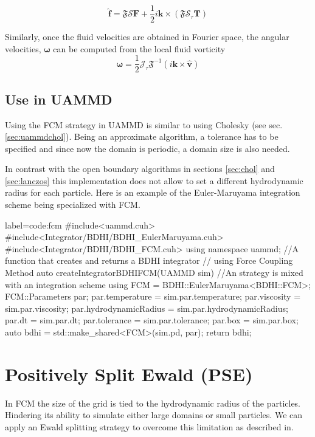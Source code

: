 \documentclass[ twoside,openright,titlepage,numbers=noenddot,%
headinclude,footinclude,cleardoublepage=empty,abstract=on,
BCOR=5mm,paper=a4,fontsize=11pt, dvipsnames
]{scrreprt}
\renewcommand{\vec}[1]{\bm{#1}}
\newcommand{\oper}[1]{\mathcal{#1}}
\newcommand{\uammd}{\gls{UAMMD}\xspace}
\newcommand{\half}{\frac{1}{2}}
\newcommand{\fou}[1]{\widehat{#1}}
\newcommand{\fvel}{v}
\begin{document}
\begin{equation}
\fou{\vec{f}} = \mathfrak{F}\oper{S}\vec{F} + \half i\vec{k}\times(\mathfrak{F}\oper{S}_\tau\vec{T})
\end{equation}

Similarly, once the fluid velocities are obtained in Fourier space, the angular velocities, $\vec{\omega}$ can be computed from the local fluid vorticity
\begin{equation}
  \vec{\omega} = \half\oper{J}_\tau\mathfrak{F}^{-1}\left(i\vec{k}\times\fou{\vec{\fvel}}\right)
\end{equation}


\subsection*{Use in UAMMD}
Using the \gls{FCM} strategy in \uammd is similar to using Cholesky (see sec. \ref{sec:uammdchol}). Being an approximate algorithm, a tolerance has to be specified and since now the domain is periodic, a domain size is also needed.

In contrast with the open boundary algorithms in sections \ref{sec:chol} and \ref{sec:lanczos} this implementation does not allow to set a different hydrodynamic radius for each particle.
Here is an example of the Euler-Maruyama integration scheme being specialized with \gls{FCM}.
\begin{code2} {label=code:fcm}
#include<uammd.cuh>
#include<Integrator/BDHI/BDHI_EulerMaruyama.cuh>
#include<Integrator/BDHI/BDHI_FCM.cuh>
using namespace uammd;
//A function that creates and returns a BDHI integrator
// using Force Coupling Method
auto createIntegratorBDHIFCM(UAMMD sim){   
  //An strategy is mixed with an integration scheme
  using FCM = BDHI::EulerMaruyama<BDHI::FCM>;
  FCM::Parameters par;
  par.temperature = sim.par.temperature;
  par.viscosity = sim.par.viscosity;
  par.hydrodynamicRadius = sim.par.hydrodynamicRadius;
  par.dt = sim.par.dt;
  par.tolerance = sim.par.tolerance;
  par.box = sim.par.box;
  auto bdhi = std::make_shared<FCM>(sim.pd, par);
  return bdhi;
}
\end{code2}

\newpage

\section{Positively Split Ewald (PSE)}\label{sec:pse}
In \gls{FCM} the size of the grid is tied to the hydrodynamic radius of the particles. Hindering its ability to simulate either large domains or small particles.
We can apply an Ewald splitting strategy to overcome this limitation as described in\cite{Fiore2017}.
\end{document}
